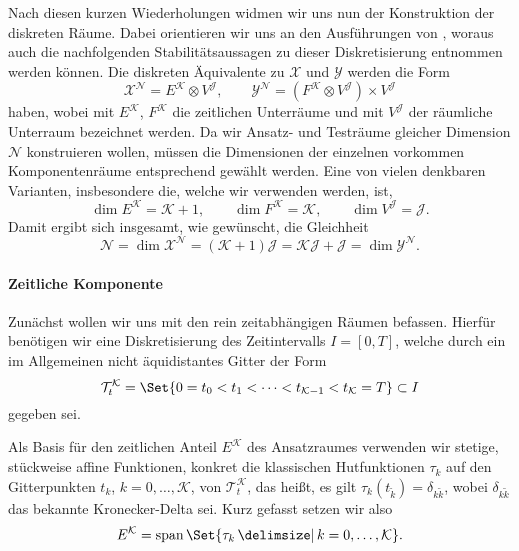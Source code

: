 Nach diesen kurzen Wiederholungen widmen wir uns nun der Konstruktion der diskreten Räume.
Dabei orientieren wir uns an den Ausführungen von \textcite{Andreev:2012ep}, woraus auch die nachfolgenden Stabilitätsaussagen zu dieser Diskretisierung entnommen werden können.
Die diskreten Äquivalente zu $\mathcal X$ und $\mathcal Y$ werden die Form
\begin{equation}
    \label{eq:gal:diskrete_tensor_raueme}
    \mathcal X^{\mathcal N} = E^{\mathcal K} \otimes V^{\mathcal J}, \qquad \mathcal Y^{\mathcal N} = (F^{\mathcal K} \otimes V^{\mathcal J}) \times V^{\mathcal J}
\end{equation}
haben, wobei mit $E^{\mathcal K}$, $F^{\mathcal K}$ die zeitlichen Unterräume und mit $V^{\mathcal J}$ der räumliche Unterraum bezeichnet werden.
Da wir Ansatz- und Testräume gleicher Dimension $\mathcal N$ konstruieren wollen, müssen die Dimensionen der einzelnen vorkommen Komponentenräume entsprechend gewählt werden.
Eine von vielen denkbaren Varianten, insbesondere die, welche wir verwenden werden, ist,
\begin{equation}
    \dim E^{\mathcal K} = \mathcal K + 1, \qquad \dim F^{\mathcal K} = \mathcal K, \qquad \dim V^{\mathcal J} = \mathcal J.
\end{equation}
Damit ergibt sich insgesamt, wie gewünscht, die Gleichheit
\begin{equation}
    \mathcal N = \dim \mathcal X^{\mathcal N} = (\mathcal K + 1) \mathcal J = \mathcal K \mathcal J + \mathcal J = \dim \mathcal Y^{\mathcal N}.
\end{equation}

\paragraph{Zeitliche Komponente} %
\label{par:zeitabh_ngige_unterr_ume}

Zunächst wollen wir uns mit den rein zeitabhängigen Räumen befassen.
Hierfür benötigen wir eine Diskretisierung des Zeitintervalls $I = [0, T]$, welche durch ein im Allgemeinen nicht äquidistantes Gitter der Form
\begin{equation}
    \mathcal T^{\mathcal K}_{t} = \Set{0 = t_0 < t_1 < \dots < t_{\mathcal K - 1} < t_{\mathcal K} = T} \subset I
\end{equation}
gegeben sei.

Als Basis für den zeitlichen Anteil $E^{\mathcal K}$ des Ansatzraumes verwenden wir stetige, stückweise affine Funktionen, konkret die klassischen Hutfunktionen $\tau_{k}$ auf den Gitterpunkten $t_{k}$, $k = 0, \dots, \mathcal K$, von $\mathcal T^{\mathcal K}_{t}$, das heißt, es gilt $\tau_{k}(t_{\tilde k}) = \delta_{k \tilde k}$, wobei $\delta_{k \tilde k}$ das bekannte Kronecker-Delta sei.
Kurz gefasst setzen wir also
\begin{equation}
    E^{\mathcal K} = \spn\Set{\tau_{k} \given k = 0, \dots, \mathcal K}.
\end{equation}

